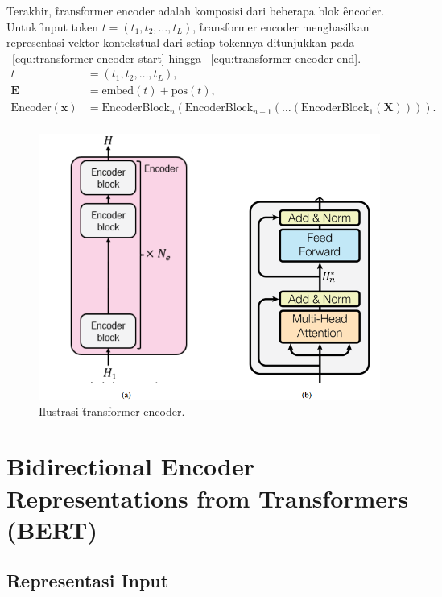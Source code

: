 	Terakhir, \f{transformer encoder} adalah komposisi dari beberapa blok \f{encoder}. Untuk \f{input} token $t=(t_1, t_2, \dots, t_L)$, \f{transformer encoder} menghasilkan representasi vektor kontekstual dari setiap tokennya ditunjukkan pada \equ~\ref{equ:transformer-encoder-start} hingga \equ~\ref{equ:transformer-encoder-end}.
	\begin{align}
		\label{equ:transformer-encoder-start} 
		t &= (t_1, t_2, \dots, t_L), \\
		\mathbf{E} &= \text{embed}(t)+ \text{pos}(t), \\
		\label{equ:transformer-encoder-end}
		\text{Encoder}(\mathbf{x}) &= \text{EncoderBlock}_n(\text{EncoderBlock}_{n-1}(\dots(\text{EncoderBlock}_1(\mathbf{X})))). \\
	\end{align}
	\begin{figure}
		\centering
		\includegraphics[width=1\textwidth]{assets/pics/final-transformers-encoder.png}
		\caption{Ilustrasi \f{transformer encoder}.}
		\label{fig:transformer-encoder}
	\end{figure}

\section{Bidirectional Encoder Representations from Transformers (BERT)}

	\subsection{Representasi Input}
	
